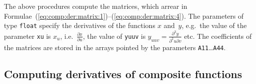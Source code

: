 \hspace*{\parindent}
The above procedures compute the matrices, which arrear in
Formulae~(\ref{eq:comp:der:matrix:1})--(\ref{eq:comp:der:matrix:4}).
The parameters of type \texttt{float} specify the derivatives of the functions
$x$ and~$y$, e.g.\ the value of the parameter \texttt{xu} is $x_u$,
i.e.\ $\frac{\partial x}{\partial u}$, the value of \texttt{yuuv}
is $y_{uuv}=\frac{\partial^3y}{\partial^2u\partial v}$
etc. The coefficients of the matrices are stored in the
arrays pointed by the parameters \texttt{A11}\ldots\texttt{A44}.


\subsection{Computing derivatives of composite functions}

